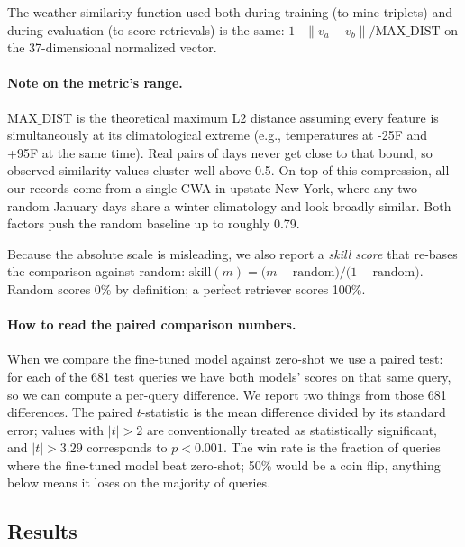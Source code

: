 \documentclass[11pt]{article}
\begin{document}
The weather similarity function used both during training (to mine triplets) and during evaluation (to score retrievals) is the same: \(1 - \|v_a - v_b\| / \mathrm{MAX\_DIST}\) on the 37-dimensional normalized vector.

\paragraph{Note on the metric's range.} \(\mathrm{MAX\_DIST}\) is the theoretical maximum L2 distance assuming every feature is simultaneously at its climatological extreme (e.g., temperatures at -25\textdegree F and +95\textdegree F at the same time). Real pairs of days never get close to that bound, so observed similarity values cluster well above 0.5. On top of this compression, all our records come from a single CWA in upstate New York, where any two random January days share a winter climatology and look broadly similar. Both factors push the random baseline up to roughly 0.79.

Because the absolute scale is misleading, we also report a \emph{skill score} that re-bases the comparison against random: \(\mathrm{skill}(m) = \bigl(m - \mathrm{random}\bigr) / \bigl(1 - \mathrm{random}\bigr)\). Random scores 0\% by definition; a perfect retriever scores 100\%.

\paragraph{How to read the paired comparison numbers.} When we compare the fine-tuned model against zero-shot we use a paired test: for each of the 681 test queries we have both models' scores on that same query, so we can compute a per-query difference. We report two things from those 681 differences. The paired \(t\)-statistic is the mean difference divided by its standard error; values with \(|t| > 2\) are conventionally treated as statistically significant, and \(|t| > 3.29\) corresponds to \(p < 0.001\). The win rate is the fraction of queries where the fine-tuned model beat zero-shot; 50\% would be a coin flip, anything below means it loses on the majority of queries.

\subsection{Results}
\end{document}
